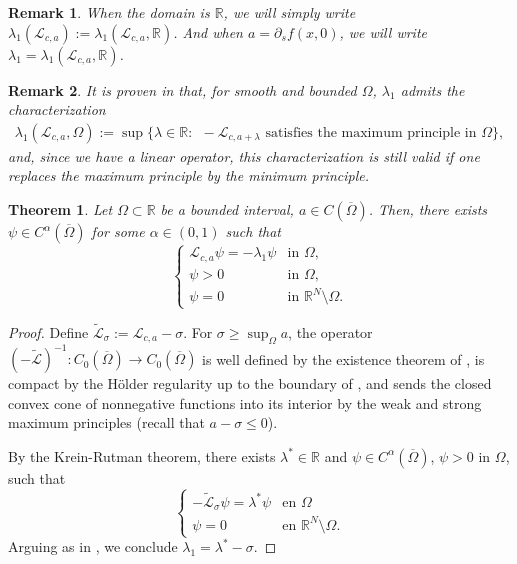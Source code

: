 \documentclass[11pt,a4paper]{amsart}
\newcommand{\Lop}{\mathcal{L}}
\newcommand{\R}{\mathbb{R}}
\newtheorem{thm}{Theorem}[section]
\newtheorem{rmk}{Remark}
\begin{document}
\begin{rmk}
When the domain is $\R$, we will simply write $\lambda_1(\Lop_{c,a}) := \lambda_1(\Lop_{c,a}, \R)$. And when $a = \partial_s f(x,0)$, we will write $\lambda_1 = \lambda_1(\Lop_{c,a}, \R)$.
\end{rmk}

\begin{rmk}
It is proven in \cite{QSX20} that, for smooth and bounded $\Omega$, $\lambda_1$ admits the characterization
\begin{align*}
\lambda_1(\Lop_{c,a}, \Omega):= \sup\{
\lambda \in \R:~~ -\Lop_{c,a+\lambda} \text{ satisfies the maximum principle in }\Omega \},
\end{align*}
and, since we have a linear operator, this characterization is still valid if one replaces the maximum principle by the minimum principle.
\end{rmk}


\begin{thm}
\label{thm:eigfunct_existence}
Let $ \Omega \subset \R$ be a bounded interval, $a \in C(\overline{\Omega})$. Then, there exists $\psi \in C^{\alpha}(\overline{\Omega})$ for some $\alpha \in (0,1)$ such that
\[\begin{cases}
\Lop_{c,a} \psi = -\lambda_1 \psi &\text{in } \Omega, \\
\psi >  0 & \text{in }  \Omega, \\
\psi = 0 & \text{in } \R^N \setminus \Omega.
\end{cases}\]
\end{thm}

\begin{proof}
Define $\tilde{\Lop}_{\sigma} := \Lop_{c,a} - \sigma$. For $\sigma \geq \sup_{\Omega} a$, the operator $(-\tilde{\Lop})^{-1}:C_0(\overline{\Omega}) \rightarrow C_0(\overline{\Omega})$ is well defined by the existence theorem of \cite{M17}, is compact by the Hölder regularity up to the boundary of \cite{QSX20}, and sends the closed convex cone of nonnegative functions into its interior by the weak and strong maximum principles (recall that $a-\sigma \leq 0$).

By the Krein-Rutman theorem, there exists $\lambda^* \in \R$ and $\psi\in C^{\alpha}(\overline{\Omega})$, $\psi >0$ in $\Omega$, such that
\[\begin{cases}
-\tilde{\Lop}_{\sigma}\psi = \lambda^* \psi & \text{en } \Omega \\ 
\psi = 0 & \text{en } \R^N \setminus \Omega.
\end{cases}\]
Arguing as in \cite{QSX20}, we conclude $\lambda_1 = \lambda^* - \sigma$. 
\end{proof}
\end{document}
